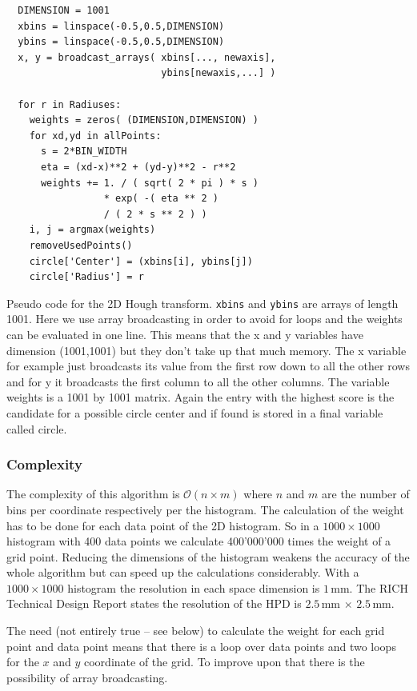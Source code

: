 \documentclass[11pt]{scrreprt}
\begin{document}
\begin{codesnippet}[htb]
\begin{lstlisting}
  DIMENSION = 1001
  xbins = linspace(-0.5,0.5,DIMENSION)
  ybins = linspace(-0.5,0.5,DIMENSION)
  x, y = broadcast_arrays( xbins[..., newaxis], 
                           ybins[newaxis,...] )

  for r in Radiuses:
    weights = zeros( (DIMENSION,DIMENSION) )
    for xd,yd in allPoints:
      s = 2*BIN_WIDTH
      eta = (xd-x)**2 + (yd-y)**2 - r**2      
      weights += 1. / ( sqrt( 2 * pi ) * s ) 
                 * exp( -( eta ** 2 ) 
                 / ( 2 * s ** 2 ) )
    i, j = argmax(weights)
    removeUsedPoints()
    circle['Center'] = (xbins[i], ybins[j])
    circle['Radius'] = r
\end{lstlisting}
  \caption[Pseudo code 2D HT]{Pseudo code for the 2D Hough transform. \texttt{xbins} and \texttt{ybins} are arrays of length 1001. Here we use array 
  broadcasting in order to avoid for loops and the weights can be evaluated in one line. This means that the x and y variables have 
  dimension (1001,1001) but they don't take up that much memory. The x variable for example just broadcasts its value from the first 
  row down to all the other rows and for y it broadcasts the first column to all the other columns. The variable weights is a 1001 by 
  1001 matrix. Again the entry with the highest score is the candidate for a possible circle center and if found is stored in a final 
  variable called circle.}
\end{codesnippet}


\subsubsection{Complexity} %
\label{ssub:complexity_2d}
The complexity of this algorithm is $\mathcal{O}(n\times m)$ where $n$ and $m$ are the number of bins per coordinate respectively per 
the histogram. The calculation of the weight has to be done for each data point of the 2D histogram. So in a $1000\times 1000$ histogram 
with 400 data points we calculate 400'000'000 times the weight of a grid point. Reducing the dimensions of the histogram weakens the 
accuracy of the whole algorithm but can speed up the calculations considerably. With a $1000\times 1000$ histogram the resolution in each 
space dimension is $1$\,mm. The RICH Technical Design Report states the resolution of the HPD is $2.5$\,mm $\times$ $2.5$\,mm.

The need (not entirely true -- see below) to calculate the weight for each grid point and data point means that there is a loop over 
data points and two loops for the $x$ and $y$ coordinate of the grid. To improve upon that there is the possibility of array broadcasting.
\end{document}
